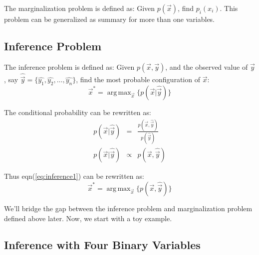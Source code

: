\documentclass[11pt,a4paper]{article}
\DeclareMathOperator*{\argmax}{arg\,max}
\begin{document}
The marginalization problem is defined as:
Given $p(\vec{x}) $, find $p_i(x_i)$. 
This problem can be generalized as summary for more than one variables. 

\subsection{Inference Problem}



The inference problem is defined as: Given $p(\vec{x},\vec{y})$, 
and the observed value of $\vec{y}$, say 
$\hat{\vec{y}}=\{\hat{y_1},\hat{y_2},\ldots, \hat{y_n}\}$, 
find the most probable configuration of $\vec{x}$:
\begin{equation}
	\vec{x}^* = \argmax_{\vec{x}} \{ p(\vec{x}|\hat{\vec{y}}) \}
	\label{eq:inference1}
\end{equation}

The conditional probability can be rewritten as:
\begin{eqnarray}
p(\vec{x}|\hat{\vec{y}}) &=& \frac{p(\vec{x},\hat{\vec{y}})}{p(\hat{\vec{y}})} \\
p(\vec{x}|\hat{\vec{y}}) &\propto & p(\vec{x},\hat{\vec{y}})
\end{eqnarray}

Thus eqn(\ref{eq:inference1}) can be rewritten as:
\begin{equation}
	\vec{x}^* = \argmax_{\vec{x}} \{ p(\vec{x},\hat{\vec{y}}) \}
	\label{eq:inference2}
\end{equation}


We'll bridge the gap between the inference problem and marginalization problem 
defined above later. Now, we start with a toy example. 

\subsection{Inference with Four Binary Variables}
\end{document}
